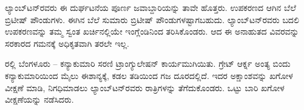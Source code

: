 ಲ್ಯಾಂಬ್​ಟನ್​ರವರು ಈ ದುರ್ಘಟನೆಯ ಪೂರ್ಣ ಜವಾಬ್ದಾರಿಯನ್ನು ತಾವೇ ಹೊತ್ತರು. ಉಪಕರಣದ ಆಗಿನ ಬೆಲೆ  ಬ್ರಿಟೀಷ್​ ಪೌಂಡುಗಳು. ಈಗಿನ ಬೆಲೆ ಸುಮಾರು  ಬ್ರಿಟೀಷ್​ ಪೌಂಡುಗಳಷ್ಟಾಗಬಹುದು. ಲ್ಯಾಂಬ್​ಟನ್​ರವರು ಬದಲಿ ಉಪಕರಣವನ್ನು ತಮ್ಮ ಸ್ವಂತ ಖರ್ಚಿನಲ್ಲಿಯೇ ಇಂಗ್ಲೆಂಡಿನಿಂದ ತರಿಸಿಕೊಂಡರು. ಆದ ಈ ಅನಾಹುತದ ವಿವರವನ್ನು ಸರಕಾರದ ಗಮನಕ್ಕೆ ಅಧಿಕೃತವಾಗಿ ತರಲೇ ಇಲ್ಲ.

ರಲ್ಲಿ ಬೆಂಗಳೂರು – ಕನ್ಯಾಕುಮಾರಿ ಸರಣಿ ಟ್ರಾಂಗ್ಯುಲೇಷನ್​ ಕಾರ್ಯ\break ಮುಗಿಯಿತು. ಗ್ರೇಟ್​ ಆರ್ಕ್ನ ಅಂತ್ಯ ಬಿಂದು ಕನ್ಯಾಕುಮಾರಿಯಿಂದ  ಮೈಲು ಈಶಾನ್ಯಕ್ಕೆ, ಕಡಲ ತಡಿಯಿಂದ  ಗಜ ದೂರದಲ್ಲಿದೆ. ಇದರ ಅಕ್ಷಾಂಶವನ್ನು ಖಗೋಳ ವೀಕ್ಷಣೆ ಮಾಡಿ, ನಿಗಧಿಮಾಡಲು ಲ್ಯಾಂಬ್​ಟನ್​ರವರು  ರಾತ್ರಿಗಳನ್ನು ತೆಗೆದುಕೊಂಡರು. ಒಟ್ಟು  ಬಾರಿ ಖಗೋಳ ವೀಕ್ಷಣೆಯನ್ನು ನಡೆಸಿದರು.


